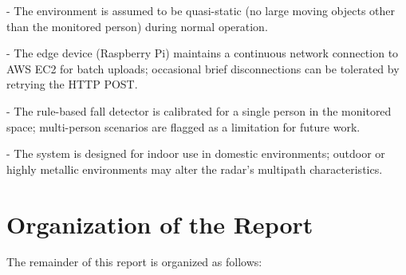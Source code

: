 - The environment is assumed to be quasi-static (no large moving objects other than the monitored person) during normal operation. 

- The edge device (Raspberry Pi) maintains a continuous network connection to AWS EC2 for batch uploads; occasional brief disconnections can be tolerated by retrying the HTTP POST. 

- The rule-based fall detector is calibrated for a single person in the monitored space; multi-person scenarios are flagged as a limitation for future work. 

- The system is designed for indoor use in domestic environments; outdoor or highly metallic environments may alter the radar's multipath characteristics. 

\section{Organization of the Report}

The remainder of this report is organized as follows: 

